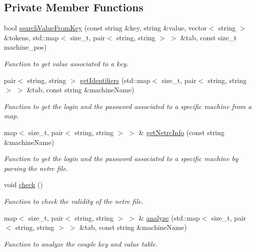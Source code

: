 \subsection*{Private Member Functions}
\begin{DoxyCompactItemize}
\item 
bool \hyperlink{classNetrcReader_a502e087b9254713d86adcb750058b1a2}{searchValueFromKey} (const string \&key, string \&value, vector$<$ string $>$ \&tokens, std::map$<$ size\_\-t, pair$<$ string, string $>$ $>$ \&tab, const size\_\-t machine\_\-pos)
\begin{DoxyCompactList}\small\item\em Function to get value associated to a key. \item\end{DoxyCompactList}\item 
pair$<$ string, string $>$ \hyperlink{classNetrcReader_af34324922c7b658e1cffdec4ebb2bff9}{getIdentifiers} (std::map$<$ size\_\-t, pair$<$ string, string $>$ $>$ \&tab, const string \&machineName)
\begin{DoxyCompactList}\small\item\em Function to get the login and the password associated to a specific machine from a map. \item\end{DoxyCompactList}\item 
map$<$ size\_\-t, pair$<$ string, string $>$ $>$ \& \hyperlink{classNetrcReader_a2561eb1c3d43af9f09b44087483c3510}{getNetrcInfo} (const string \&machineName)
\begin{DoxyCompactList}\small\item\em Function to get the login and the password associated to a specific machine by parsing the netrc file. \item\end{DoxyCompactList}\item 
void \hyperlink{classNetrcReader_ab4ad93bf19ce8654d56cd5f5eada7d20}{check} ()
\begin{DoxyCompactList}\small\item\em Function to check the validity of the netrc file. \item\end{DoxyCompactList}\item 
map$<$ size\_\-t, pair$<$ string, string $>$ $>$ \& \hyperlink{classNetrcReader_a48590ae85fc7b2369ff042b72a5c44ef}{analyze} (std::map$<$ size\_\-t, pair$<$ string, string $>$ $>$ \&tab, const string \&machineName)
\begin{DoxyCompactList}\small\item\em Function to analyze the couple key and value table. \item\end{DoxyCompactList}\end{DoxyCompactItemize}
